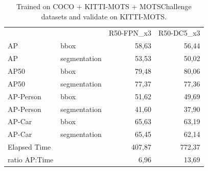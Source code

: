 \documentclass[11pt,a4paper,twocolumn,twoside]{article}
\begin{document}
\begin{table}[hbt]
    \centering
\begin{tabularx}{\textwidth}{|l|l|r|r|} \cline{1-4}
              &              & \multicolumn{1}{l|}{R50-FPN\_x3} & \multicolumn{1}{l|}{R50-DC5\_x3} \\ \cline{1-4}
AP            & bbox         & 58,63                            & 56,44                            \\ \cline{1-4}
AP            & segmentation & 53,53                            & 50,02                            \\ \cline{1-4}
AP50          & bbox         & 79,48                            & 80,06                            \\ \cline{1-4}
AP50          & segmentation & 77,37                            & 77,36                            \\ \cline{1-4}
AP-Person     & bbox         & 51,62                            & 49,69                            \\ \cline{1-4}
AP-Person     & segmentation & 41,60                            & 37,90                            \\ \cline{1-4}
AP-Car        & bbox         & 65,63                            & 63,19                            \\ \cline{1-4}
AP-Car        & segmentation & 65,45                            & 62,14                            \\ \cline{1-4}
Elapsed Time  &              & 407,87                           & 772,37                           \\ \cline{1-4}
ratio AP:Time &              & 6,96                             & 13,69                            \\ \cline{1-4} 
\end{tabularx}
\caption{\label{table:task_b_COCO_motschallenge}Trained on COCO + KITTI-MOTS + MOTSChallenge datasets and validate on KITTI-MOTS.}
\end{table}
\end{document}
